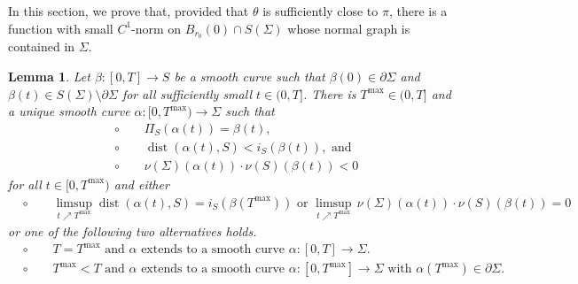 \documentclass[11pt]{amsart}
\newtheorem{lem}[prop]{Lemma}
\begin{document}
In this section, we prove that, provided that $\theta$ is sufficiently close to $\pi$, there is a function with small $C^1$-norm on $B_{r_0}(0)\cap S(\Sigma)$  whose normal graph is contained in $\Sigma$.
\begin{lem} \label{lift} 
	Let $\beta:[0, T]\to S$ be a smooth curve such that $\beta(0)\in \partial \Sigma$ and $\beta(t)\in S(\Sigma)\setminus \partial \Sigma$ for all sufficiently small $t\in (0, T]$. There is $T^{\max}\in(0, T]$ and  a unique smooth curve $\alpha:[0, T^{\max})\to \Sigma$ such that 
	\begin{equation} \label{lift properties} 
	\begin{aligned}
		&\circ \qquad 	\Pi_S(\alpha(t))=\beta(t),\\
		&\circ \qquad  \operatorname{dist}(\alpha(t),S)<i_S(\beta(t)),\text{ and}\\
		&\circ \qquad \nu(\Sigma)(\alpha(t))\cdot \nu(S)(\beta(t))< 0
	\end{aligned} 
	\end{equation} 
for all $t\in[0,T^{\max})$ and either 
	\begin{align}
	&	\circ\qquad \text{$\limsup_{t\nearrow T^{\max}}\operatorname{dist}(\alpha(t),S)=i_S(\beta(T^{\max}))$ or  $\limsup_{t\nearrow T^{\max}}\, \nu(\Sigma)(\alpha(t))\cdot \nu(S)(\beta(t))=0$} \label{alternative A}
\end{align}
or  one of the following two alternatives holds.
\begin{align} 
	&	\circ\qquad \text{$T= T^{\max}$ and $\alpha$ extends to a smooth curve $\alpha:[0,T]\to \Sigma$.} \label{alternative B}\\
	&	\circ\qquad \text{$T^{\max}< T$ and $\alpha$ extends to a smooth curve $\alpha:[0,T^{\max}]\to \Sigma$ with $\alpha(T^{\max})\in \partial \Sigma$.} \label{alternative C}
	\end{align}

\end{lem}
\end{document}
